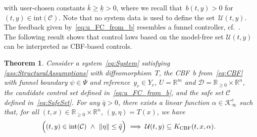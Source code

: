 \documentclass[journal,twoside,web]{ieeeconf}
\newcommand{\R}{\mathbb{R}}
\newtheorem{thm}{Theorem}
\begin{document}
with user-chosen constants $\overline{k}\geq \underline{k}>0$, where we recall that~$b(t,y) > 0$ for~$(t,y) \in \text{int}(\mathcal{C})$. 
%
Note that no system data is used to define the set~$\mathcal{U}(t,y)$.
The feedback given by~\eqref{eq:u_FC_from_b} resembles a funnel controller, cf.~\cite[Eq.~(2)]{IlchRyan02b}. 
The following result shows that control laws based on the model-free set $\mathcal{U}(t,y)$ can be interpreted as CBF-based controls.
%
\begin{thm} \label{Thm:UinK}
Consider a system~\eqref{eq:System} satisfying \cref{ass:StructuralAssumptions} with diffeomorphism~$T$, the CBF~$b$ from~\eqref{eq:CBF} with funnel boundary 
$\psi \in \Psi$ and reference~$y_r \in Y_r$,
$U=\R^m$ and $\mathcal{D}= \R_{\ge 0}\times\R^n$, 
the candidate control set defined in~\eqref{eq:u_FC_from_b}, and the safe set $\mathcal{C}$ defined in~\eqref{eq:SafeSet}. 
For any $\bar{q}>0$, 
there exists a linear function $\alpha\in\mathcal{K}^e_\infty$ such that, for all $(t,x)\in\R_{\ge 0}\times\R^n$, $(y,\eta)=T(x)$, we have
\[
    \Big( (t,y)\in \mathrm{int}(\mathcal{C})\ \wedge\ \|\eta\| \le \bar{q} \Big)
    \implies  \mathcal{U}(t,y) \subseteq K_{\rm CBF}(t,x,\alpha).
\]
\end{thm}
\end{document}
